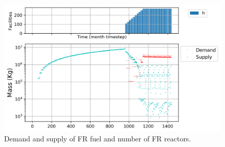 \documentclass[11pt]{article}
\begin{document}
\begin{figure}[H]
	\centering
	\includegraphics[width=\textwidth]{23-figures/0-poly-mixerout.png} 
	\hfill
	\caption{Demand and supply of FR fuel and number of FR reactors.}
	\label{fig:23-mixerout}
\end{figure}
\end{document}
